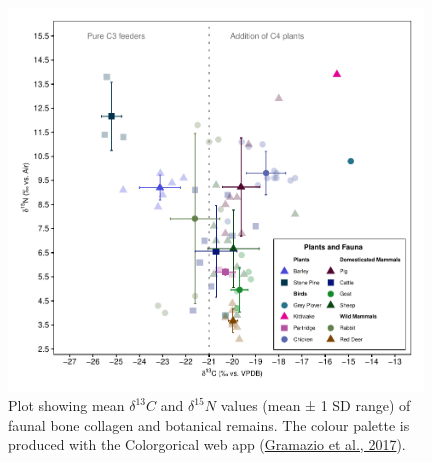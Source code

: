 \documentclass[preprint, 3p, authoryear]{elsarticle} %
\begin{document}
\begin{figure}
\includegraphics[width=0.98\textwidth]{RPaladugu_Castro_files/figure-latex/fauna-carbnitro-iso-plot-1} \caption{Plot showing mean \(\delta ^{13}C\) and \(\delta ^{15}N\) values (mean ± 1 SD range) of faunal bone collagen and botanical remains. The colour palette is produced with the Colorgorical web app (\protect\hyperlink{ref-gramazio_etal17}{Gramazio et al., 2017}).}\label{fig:fauna-carbnitro-iso-plot}
\end{figure}
\end{document}
